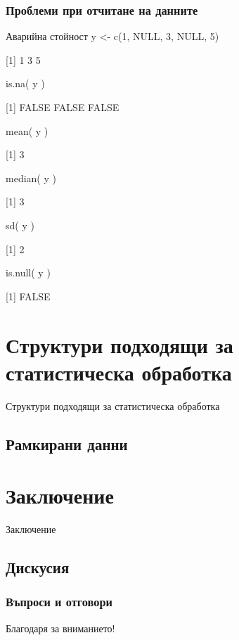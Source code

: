 \documentclass{beamer}
\begin{document}
\begin{frame}
\frametitle{Проблеми при отчитане на данните}
\begin{block}{Аварийна стойност}
y <- c(1, NULL, 3, NULL, 5)

[1] 1 3 5

is.na( y )

[1] FALSE FALSE FALSE

mean( y )

[1] 3

median( y )

[1] 3

sd( y )

[1] 2

is.null( y )

[1] FALSE
\end{block}
\end{frame}

\section{Структури подходящи за статистическа обработка}

\begin{frame}
\center \huge{Структури подходящи за статистическа обработка}
\end{frame}

\subsection{Рамкирани данни}

\section{Заключение}

\begin{frame}
\center \huge{Заключение}
\end{frame}

\subsection{Дискусия}

\begin{frame}
\frametitle{Въпроси и отговори}
\center \huge{Благодаря за вниманието!}
\end{frame}
\end{document}

